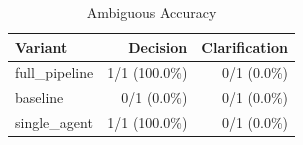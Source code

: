 \begin{table}[htbp]
\centering
\caption{Ambiguous Accuracy}
\label{tab:acc-ambig}
\begin{tabular}{l rr}
\toprule
Variant & Decision & Clarification \\
\midrule
  full\_pipeline & 1/1 (100.0\%) & 0/1 (0.0\%) \\
  baseline & 0/1 (0.0\%) & 0/1 (0.0\%) \\
  single\_agent & 1/1 (100.0\%) & 0/1 (0.0\%) \\
\bottomrule
\end{tabular}
\end{table}

